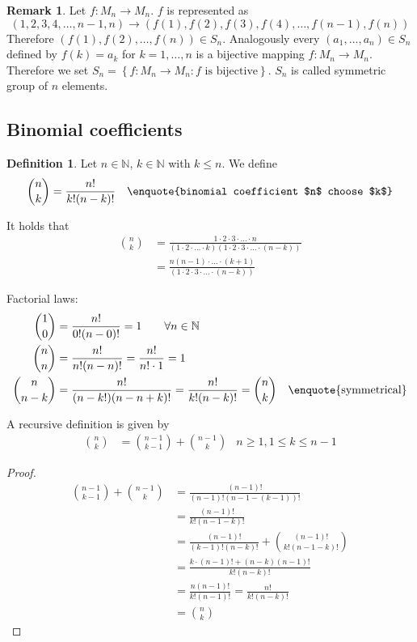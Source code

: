 \documentclass[a4paper,landscape,twocolumn]{article}
\theoremstyle{definition}
\newtheorem{defi}{Definition}
\newtheorem{rem}{Remark}
\newcommand\set[1]{\left\{#1\right\}}
\begin{document}
\begin{rem}
  Let $f: M_n \rightarrow M_n$. $f$ is represented as
  \[  (1, 2, 3, 4, \ldots, n-1, n) \rightarrow (f(1), f(2), f(3), f(4), \ldots, f(n-1), f(n))  \]
  Therefore $(f(1), f(2), \ldots, f(n)) \in S_n$. Analogously every $(a_1, \ldots, a_n) \in S_n$
  defined by $f(k) = a_k$ for $k=1,\ldots,n$ is a bijective mapping $f: M_n \rightarrow M_n$.
  Therefore we set $S_n = \set{f: M_n \rightarrow M_n: f \text{ is bijective}}$.
  $S_n$ is called symmetric group of $n$ elements.
\end{rem}

\subsection{Binomial coefficients}
\begin{defi}
  Let $n \in \mathbb{N}$, $k \in \mathbb{N}$ with $k \leq n$.
  We define \begin{align*}
    \binom{n}{k} &= \frac{n!}{k! (n-k)!}   & \text{\enquote{binomial coefficient $n$ choose $k$}}
  \end{align*}
\end{defi}

It holds that
\begin{align*}
  \binom{n}{k} &= \frac{1\cdot 2\cdot 3\cdot \ldots \cdot n}{(1 \cdot 2 \cdot \ldots \cdot k) (1 \cdot 2 \cdot 3 \cdot \ldots \cdot (n-k))} \\
               &= \frac{n (n-1) \cdot \ldots \cdot (k+1)}{(1 \cdot 2 \cdot 3 \cdot \ldots \cdot (n-k))}
\end{align*}

Factorial laws:
\begin{align*}
  \binom 10 &= \frac{n!}{0! (n-0)!} = 1 \qquad \forall n \in \mathbb{N} \\
  \binom nn &= \frac{n!}{n! (n - n)!} = \frac{n!}{n! \cdot 1} = 1 \\
  \binom{n}{n-k} &= \frac{n!}{(n-k!)(n - n + k)!} = \frac{n!}{k! (n-k)!} = \binom nk & \text{\enquote{symmetrical}}
\end{align*}

A recursive definition is given by
\begin{align*}
    \binom nk &= \binom{n-1}{k-1} + \binom{n-1}{k}
    & n \geq 1, 1 \leq k \leq n-1
\end{align*}

\begin{proof}
  \begin{align*}
      \binom{n-1}{k-1} + \binom{n-1}{k}
          &= \frac{(n-1)!}{(n-1)! (n-1 - (k-1))!} \\
          &= \frac{(n-1)!}{k! (n-1-k)!} \\
      &= \frac{(n-1)!}{(k-1)! (n-k)!} + \binom{(n-1)!}{k! (n-1-k)!} \\
      &= \frac{k \cdot (n-1)! + (n-k)(n-1)!}{k! (n-k)!} \\
      &= \frac{n (n-1)!}{k!(n-1)!} = \frac{n!}{k! (n-k)!} \\
      &= \binom nk
  \end{align*}
\end{proof}
\end{document}
